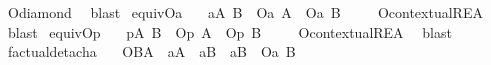 \begin{isabellebody}
\endisadelimproof
%
\isatagproof
{}\isamarkupfalse%
\ O{\isacharunderscore}diamond\ \isamarkupfalse%
\ blast%
\endisatagproof
{\isafoldproof}%
%
\isadelimproof
\isanewline
%
\endisadelimproof
{}\isamarkupfalse%
\ equiv{\isacharunderscore}Oa{\isacharcolon}\isanewline
\ \ \ {\isachardoublequoteopen}{\isasymTurnstile}{\isacharparenleft}{\isacharparenleft}{\isasymbox}\isactrlsub a{\isacharparenleft}A\ \isactrlbold {\isasymequiv}B{\isacharparenright}{\isacharparenright}\ \isactrlbold {\isasymrightarrow}\ {\isacharparenleft}{\isacharparenleft}O\isactrlsub a\ A{\isacharparenright}\ \isactrlbold {\isasymequiv}\ {\isacharparenleft}O\isactrlsub a\ B{\isacharparenright}\ {\isacharparenright}{\isacharparenright}{\isachardoublequoteclose}\isanewline
%
\isadelimproof
\ \ %
\endisadelimproof
%
\isatagproof
{}\isamarkupfalse%
\ O{\isacharunderscore}contextual{\isacharunderscore}REA\ \isamarkupfalse%
\ blast%
\endisatagproof
{\isafoldproof}%
%
\isadelimproof
\isanewline
%
\endisadelimproof
{}\isamarkupfalse%
\ equiv{\isacharunderscore}Op{\isacharcolon}\isanewline
\ \ \ {\isachardoublequoteopen}{\isasymTurnstile}{\isacharparenleft}{\isacharparenleft}{\isasymbox}\isactrlsub p{\isacharparenleft}A\ \isactrlbold {\isasymequiv}B{\isacharparenright}{\isacharparenright}\ \isactrlbold {\isasymrightarrow}\ {\isacharparenleft}{\isacharparenleft}O\isactrlsub p\ A{\isacharparenright}\ \isactrlbold {\isasymequiv}\ {\isacharparenleft}O\isactrlsub p\ B{\isacharparenright}\ {\isacharparenright}{\isacharparenright}{\isachardoublequoteclose}\isanewline
%
\isadelimproof
\ \ %
\endisadelimproof
%
\isatagproof
{}\isamarkupfalse%
\ O{\isacharunderscore}contextual{\isacharunderscore}REA\ \isamarkupfalse%
\ blast\isanewline
\isanewline
%
%
\endisatagproof
{\isafoldproof}%
%
\isadelimproof
\isanewline
%
\endisadelimproof
{}\isamarkupfalse%
\ factual{\isacharunderscore}detach{\isacharunderscore}a{\isacharcolon}\isanewline
\ \ \ {\isachardoublequoteopen}{\isasymTurnstile}{\isacharparenleft}{\isacharparenleft}{\isacharparenleft}O{\isacharbraceleft}B{\isacharbar}A{\isacharbraceright}\ \isactrlbold {\isasymand}\ {\isacharparenleft}{\isasymbox}\isactrlsub aA{\isacharparenright}{\isacharparenright}\ \isactrlbold {\isasymand}\ {\isacharparenleft}{\isacharparenleft}{\isasymdiamond}\isactrlsub aB{\isacharparenright}\ \isactrlbold {\isasymand}\ {\isacharparenleft}{\isasymdiamond}\isactrlsub a{\isacharparenleft}\isactrlbold {\isasymnot}B{\isacharparenright}{\isacharparenright}{\isacharparenright}{\isacharparenright}\ \isactrlbold {\isasymrightarrow}\ {\isacharparenleft}O\isactrlsub a\ B{\isacharparenright}{\isacharparenright}{\isachardoublequoteclose}\isanewline

\end{isabellebody}
